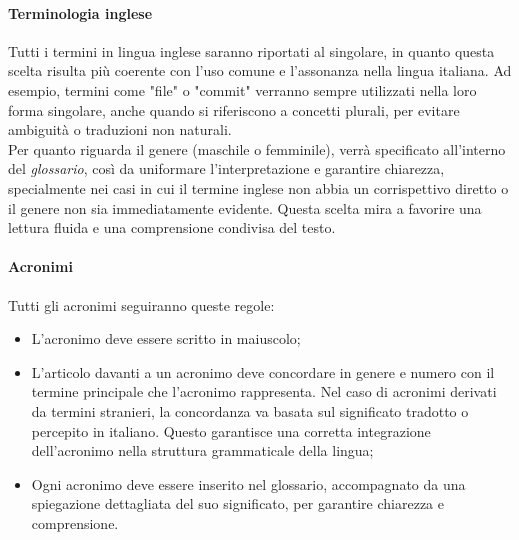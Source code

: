 \paragraph{Terminologia inglese}
Tutti i termini in lingua inglese saranno riportati al singolare, in quanto
questa scelta risulta più coerente con l'uso comune e l'assonanza nella lingua
italiana. Ad esempio, termini come "file" o "commit" verranno sempre utilizzati
nella loro forma singolare, anche quando si riferiscono a concetti plurali, per
evitare ambiguità o traduzioni non naturali.\\ Per quanto riguarda il genere
(maschile o femminile), verrà specificato all'interno del \textit{glossario},
così da uniformare l'interpretazione e garantire chiarezza, specialmente nei
casi in cui il termine inglese non abbia un corrispettivo diretto o il genere
non sia immediatamente evidente. Questa scelta mira a favorire una lettura
fluida e una comprensione condivisa del testo.
\paragraph{Acronimi}
Tutti gli acronimi seguiranno queste regole:
\begin{itemize}
    \item L'acronimo deve essere scritto in maiuscolo;
    \item L'articolo davanti a un acronimo deve concordare in genere e numero con il
          termine principale che l'acronimo rappresenta. Nel caso di acronimi derivati da
          termini stranieri, la concordanza va basata sul significato tradotto o
          percepito in italiano. Questo garantisce una corretta integrazione
          dell'acronimo nella struttura grammaticale della lingua;
    \item Ogni acronimo deve essere inserito nel glossario, accompagnato da una
          spiegazione dettagliata del suo significato, per garantire chiarezza e
          comprensione.
\end{itemize}
